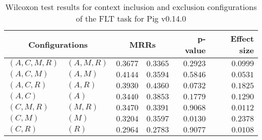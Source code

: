 
\begin{table}
\begin{spacing}{1.2}
\centering
\caption{Wilcoxon test results for context inclusion and exclusion configurations of the FLT task for Pig v0.14.0}
\label{table:versus-wilcox-pig-flt-context}
\begin{tabular}{ll|rr|rr}
\toprule
      \multicolumn{2}{c|}{Configurations} &          \multicolumn{2}{c|}{MRRs} &       p-value & Effect size \\
\midrule
 $(A,C,M,R)$ &  $(A,M,R)$ & $0.3677$ & $0.3365$ & $0.2923$ &    $0.0999$ \\
   $(A,C,M)$ &    $(A,M)$ & $0.4144$ & $0.3594$ & $0.5846$ &    $0.0531$ \\
   $(A,C,R)$ &    $(A,R)$ & $0.3930$ & $0.4360$ & $0.0732$ &    $0.1825$ \\
     $(A,C)$ &      $(A)$ & $0.3440$ & $0.3853$ & $0.1779$ &    $0.1290$ \\
   $(C,M,R)$ &    $(M,R)$ & $0.3470$ & $0.3391$ & $0.9068$ &    $0.0112$ \\
     $(C,M)$ &      $(M)$ & $0.3204$ & $0.3597$ & $0.0130$ &    $0.2378$ \\
     $(C,R)$ &      $(R)$ & $0.2964$ & $0.2783$ & $0.9077$ &    $0.0108$ \\
\bottomrule
\end{tabular}

\end{spacing}
\end{table}

